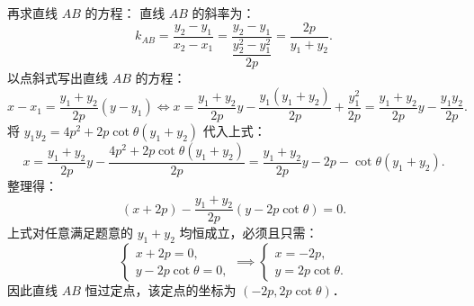 \begin{answer}
再求直线 $AB$ 的方程：
直线 $AB$ 的斜率为：
\nopagebreak[4]
\[
k_{AB} = \dfrac{y_2 - y_1}{x_2 - x_1} = \dfrac{y_2 - y_1}{\dfrac{y_2^2 - y_1^2}{2p}} = \dfrac{2p}{y_1 + y_2}.
\]
以点斜式写出直线 $AB$ 的方程：
\nopagebreak[4]
\[
x - x_1 = \dfrac{y_1 + y_2}{2p}(y - y_1) \iff x = \dfrac{y_1 + y_2}{2p} y - \dfrac{y_1(y_1 + y_2)}{2p} + \dfrac{y_1^2}{2p} = \dfrac{y_1 + y_2}{2p} y - \dfrac{y_1 y_2}{2p}.
\]
将 $y_1 y_2 = 4p^2 + 2p\cot\theta (y_1 + y_2)$ 代入上式：
\nopagebreak[4]
\[
x = \dfrac{y_1 + y_2}{2p} y - \dfrac{4p^2 + 2p\cot\theta(y_1 + y_2)}{2p} = \dfrac{y_1 + y_2}{2p} y - 2p - \cot\theta (y_1 + y_2).
\]
整理得：
\nopagebreak[4]
\[
(x + 2p) - \dfrac{y_1 + y_2}{2p}(y - 2p\cot\theta) = 0.
\]
上式对任意满足题意的 $y_1 + y_2$ 均恒成立，必须且只需：
\nopagebreak[4]
\[
\begin{cases} x + 2p = 0, \\ y - 2p\cot\theta = 0, \end{cases} \implies \begin{cases} x = -2p, \\ y = 2p\cot\theta. \end{cases}
\]
因此直线 $AB$ 恒过定点，该定点的坐标为 $(-2p, 2p\cot\theta)$．



\end{answer}